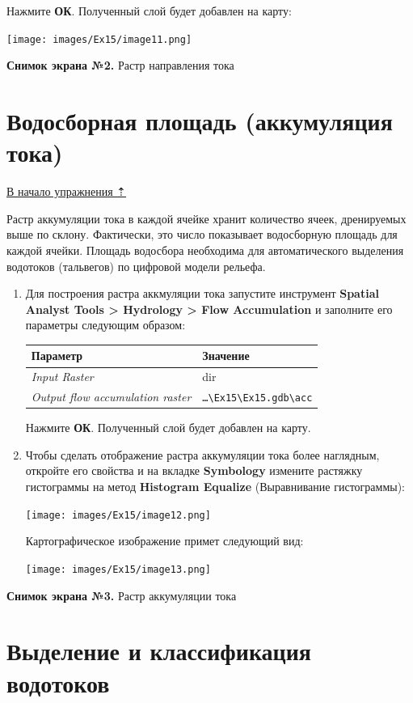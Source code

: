 \documentclass[12pt,]{book}
\begin{document}
Нажмите \textbf{ОК}. Полученный слой будет добавлен на карту:

\texttt{[image: images/Ex15/image11.png]}

\textbf{Снимок экрана №2.} Растр направления тока

\hypertarget{dem-flowacc}{%
\section{Водосборная площадь (аккумуляция тока)}\label{dem-flowacc}}

\protect\hyperlink{dem}{В начало упражнения ⇡}

Растр аккумуляции тока в каждой ячейке хранит количество ячеек, дренируемых выше по склону. Фактически, это число показывает водосборную площадь для каждой ячейки. Площадь водосбора необходима для автоматического выделения водотоков (тальвегов) по цифровой модели рельефа.

\begin{enumerate}
\def\labelenumi{\arabic{enumi}.}
\item
  Для построения растра аккмуляции тока запустите инструмент \textbf{Spatial Analyst Tools \textgreater{} Hydrology \textgreater{} Flow Accumulation} и заполните его параметры следующим образом:

  \begin{longtable}[]{@{}ll@{}}
  \toprule
  Параметр & Значение\tabularnewline
  \midrule
  \endhead
  \emph{Input Raster} & dir\tabularnewline
  \emph{Output flow accumulation raster} & \texttt{\ldots{}\textbackslash{}Ex15\textbackslash{}Ex15.gdb\textbackslash{}acc}\tabularnewline
  \bottomrule
  \end{longtable}

  Нажмите \textbf{ОК}. Полученный слой будет добавлен на карту.
\item
  Чтобы сделать отображение растра аккумуляции тока более наглядным, откройте его свойства и на вкладке \textbf{Symbology} измените растяжку гистограммы на метод \textbf{Histogram Equalize} (Выравнивание гистограммы):

  \texttt{[image: images/Ex15/image12.png]}

  Картографическое изображение примет следующий вид:

  \texttt{[image: images/Ex15/image13.png]}
\end{enumerate}

\textbf{Снимок экрана №3.} Растр аккумуляции тока

\hypertarget{dem-classify}{%
\section{Выделение и классификация водотоков}\label{dem-classify}}
\end{document}
